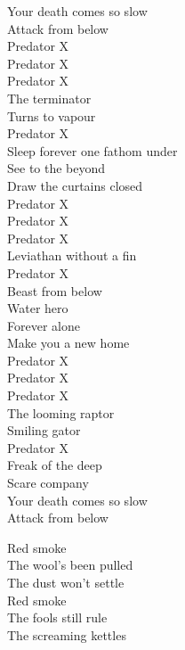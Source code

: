 Your death comes so slow\\
Attack from below\\

Predator X\\
Predator X\\
Predator X\\
The terminator\\
Turns to vapour\\
Predator X\\
Sleep forever one fathom under\\

See to the beyond\\
Draw the curtains closed\\

Predator X\\
Predator X\\
Predator X\\
Leviathan without a fin\\
Predator X\\
Beast from below\\
Water hero\\

Forever alone\\
Make you a new home\\

Predator X\\
Predator X\\
Predator X\\
The looming raptor\\
Smiling gator\\
Predator X\\
Freak of the deep\\
Scare company\\

Your death comes so slow\\
Attack from below\\




Red smoke\\
The wool's been pulled\\
The dust won't settle\\
Red smoke\\
The fools still rule\\
The screaming kettles\

